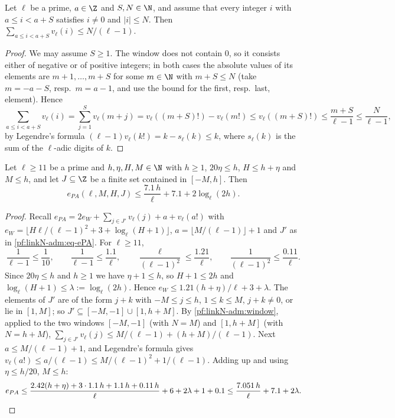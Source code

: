 \begin{lemma}\label{pf:linkN-adm:window}
Let $\ell$ be a prime, $a\in\Z$ and $S,N\in\N$, and assume that every integer $i$ with $a\le i<a+S$ satisfies $i\ne0$ and
$|i|\le N$. Then $\sum_{a\le i<a+S}v_\ell(i)\le N/(\ell-1)$.
\end{lemma}

\begin{proof}
We may assume $S\ge1$. The window does not contain $0$, so it consists either of negative or of positive integers; in
both cases the absolute values of its elements are $m+1,\dots,m+S$ for some $m\in\N$ with $m+S\le N$ (take $m=-a-S$,
resp.\ $m=a-1$, and use the bound for the first, resp.\ last, element). Hence
\[
\sum_{a\le i<a+S}v_\ell(i)=\sum_{j=1}^Sv_\ell(m+j)=v_\ell((m+S)!)-v_\ell(m!)\le v_\ell((m+S)!)\le\frac{m+S}{\ell-1}\le\frac N{\ell-1},
\]
by Legendre's formula $(\ell-1)v_\ell(k!)=k-s_\ell(k)\le k$, where $s_\ell(k)$ is the sum of the $\ell$-adic digits of $k$.
\end{proof}

\begin{lemma}\label{pf:linkN-adm:ePA}
Let $\ell\ge11$ be a prime and $h,\eta,H,M\in\N$ with $h\ge1$, $20\eta\le h$, $H\le h+\eta$ and $M\le h$, and let
$J\subseteq\Z$ be a finite set contained in $[-M,h]$. Then
\[
e_{PA}(\ell,M,H,J)\le\frac{7.1\,h}\ell+7.1+2\log_\ell(2h).
\]
\end{lemma}

\begin{proof}
Recall $e_{PA}=2e_W+\sum_{j\in J'}v_\ell(j)+a+v_\ell(a!)$ with $e_W=\lfloor H\ell/(\ell-1)^2+3+\log_\ell(H+1)\rfloor$,
$a=\lfloor M/(\ell-1)\rfloor+1$ and $J'$ as in \eqref{pf:linkN-adm:eq-ePA}. For $\ell\ge11$,
\[
\frac1{\ell-1}\le\frac1{10},\qquad\frac1{\ell-1}\le\frac{1.1}\ell,\qquad\frac\ell{(\ell-1)^2}\le\frac{1.21}\ell,\qquad
\frac1{(\ell-1)^2}\le\frac{0.11}\ell .
\]
Since $20\eta\le h$ and $h\ge1$ we have $\eta+1\le h$, so $H+1\le2h$ and $\log_\ell(H+1)\le\lambda:=\log_\ell(2h)$. Hence
$e_W\le1.21(h+\eta)/\ell+3+\lambda$. The elements of $J'$ are of the form $j+k$ with $-M\le j\le h$, $1\le k\le M$,
$j+k\ne0$, or lie in $[1,M]$; so $J'\subseteq[-M,-1]\cup[1,h+M]$. By \cref{pf:linkN-adm:window}, applied to the two windows
$[-M,-1]$ (with $N=M$) and $[1,h+M]$ (with $N=h+M$), $\sum_{j\in J'}v_\ell(j)\le M/(\ell-1)+(h+M)/(\ell-1)$. Next
$a\le M/(\ell-1)+1$, and Legendre's formula gives $v_\ell(a!)\le a/(\ell-1)\le M/(\ell-1)^2+1/(\ell-1)$. Adding up and using
$\eta\le h/20$, $M\le h$:
\[
e_{PA}\le\frac{2.42(h+\eta)+3\cdot1.1\,h+1.1\,h+0.11\,h}\ell+6+2\lambda+1+0.1
\le\frac{7.051\,h}\ell+7.1+2\lambda .\qedhere
\]
\end{proof}

